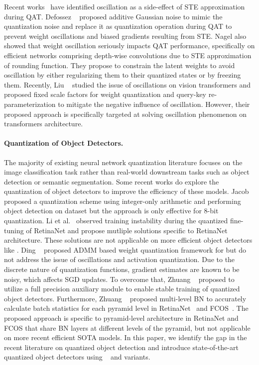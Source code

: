 Recent works~\cite{defossez2022differentiable, nagel2022overcoming} have identified oscillation as a side-effect of \acrshort{STE} approximation during \acrshort{QAT}. Defossez \etal~\cite{defossez2022differentiable} proposed additive Gaussian noise to mimic the quantization noise and replace it as quantization operation during \acrshort{QAT} to prevent weight oscillations and biased gradients resulting from \acrshort{STE}. Nagel \etal \cite{nagel2022overcoming} also showed that weight oscillation seriously impacts \acrshort{QAT} performance, specifically on efficient networks comprising depth-wise convolutions due to \acrshort{STE} approximation of rounding function. They propose to constrain the latent weights to avoid oscillation by either regularizing them to their quantized states or by freezing them. Recently, Liu \etal~\cite{liu2023oscillation} studied the issue of oscillations on vision transformers and proposed fixed scale factors for weight quantization and query-key re-parameterization to mitigate the negative influence of oscillation. However, their proposed approach is specifically targeted at solving oscillation phenomenon on transformers architecture. 

\paragraph{Quantization of  Object Detectors.}
The majority of existing neural network quantization literature focuses on the image classification task rather than real-world downstream tasks such as object detection or semantic segmentation. 
Some recent works do explore the quantization of object detectors to improve the efficiency of these models. Jacob \etal~\cite{jacob2018cvpr} proposed a quantization scheme using integer-only arithmetic and performing object detection on \coco{} dataset but the approach is only effective for 8-bit quantization. Li et al.~\cite{li2019fully} observed training instability during the quantized fine-tuning of RetinaNet and propose mutliple solutions specific to RetinaNet architecture. These solutions are not applicable on more efficient object detectors like \yolo{}. Ding \etal~\cite{ding2019req} proposed ADMM based weight quantization framework for  but do not address the issue of oscillations and activation quantization.  Due to the discrete nature of quantization functions, gradient estimates are known to be noisy, which affects \acrfull{SGD} updates. To overcome that, Zhuang \etal~\cite{zhuang2020training} proposed to utilize a full precision auxiliary module to enable stable training of quantized object detectors. Furthermore, Zhuang \etal~\cite{chen2021aqd} proposed multi-level \acrfull{BN} to accurately calculate batch statistics for each pyramid level in RetinaNet~\cite{lin2017focal} and FCOS~\cite{tian2019fcos}. The proposed approach is specific to pyramid-level architecture in RetinaNet and FCOS that share \acrshort{BN} layers at different levels of the pyramid, but not applicable on more recent efficient SOTA \yolo{} 
models. In this paper, we identify the gap in the recent literature on quantized object detection and introduce state-of-the-art quantized object detectors using \yoloa{}~\cite{yolov5} and \yolob{}\cite{wang2022yolov7} variants. 

